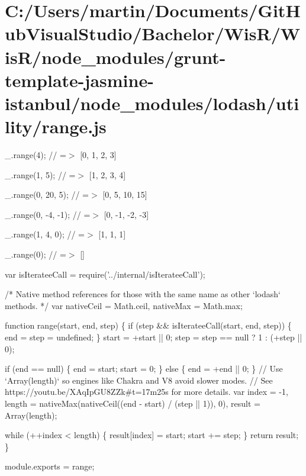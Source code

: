 \hypertarget{_c_1_2_users_2martin_2_documents_2_git_hub_visual_studio_2_bachelor_2_wis_r_2_wis_r_2node_module293574b757bfc04319911d22b9d7889f}{}\section{C\+:/\+Users/martin/\+Documents/\+Git\+Hub\+Visual\+Studio/\+Bachelor/\+Wis\+R/\+Wis\+R/node\+\_\+modules/grunt-\/template-\/jasmine-\/istanbul/node\+\_\+modules/lodash/utility/range.\+js}
\+\_\+.\+range(4); // =$>$ \mbox{[}0, 1, 2, 3\mbox{]}

\+\_\+.\+range(1, 5); // =$>$ \mbox{[}1, 2, 3, 4\mbox{]}

\+\_\+.\+range(0, 20, 5); // =$>$ \mbox{[}0, 5, 10, 15\mbox{]}

\+\_\+.\+range(0, -\/4, -\/1); // =$>$ \mbox{[}0, -\/1, -\/2, -\/3\mbox{]}

\+\_\+.\+range(1, 4, 0); // =$>$ \mbox{[}1, 1, 1\mbox{]}

\+\_\+.\+range(0); // =$>$ \mbox{[}\mbox{]}


\begin{DoxyCodeInclude}
var isIterateeCall = require(\textcolor{stringliteral}{'../internal/isIterateeCall'});

\textcolor{comment}{/* Native method references for those with the same name as other `lodash` methods. */}
var nativeCeil = Math.ceil,
    nativeMax = Math.max;

\textcolor{keyword}{function} range(start, end, step) \{
  \textcolor{keywordflow}{if} (step && isIterateeCall(start, end, step)) \{
    end = step = undefined;
  \}
  start = +start || 0;
  step = step == null ? 1 : (+step || 0);

  \textcolor{keywordflow}{if} (end == null) \{
    end = start;
    start = 0;
  \} \textcolor{keywordflow}{else} \{
    end = +end || 0;
  \}
  \textcolor{comment}{// Use `Array(length)` so engines like Chakra and V8 avoid slower modes.}
  \textcolor{comment}{// See https://youtu.be/XAqIpGU8ZZk#t=17m25s for more details.}
  var index = -1,
      length = nativeMax(nativeCeil((end - start) / (step || 1)), 0),
      result = Array(length);

  \textcolor{keywordflow}{while} (++index < length) \{
    result[index] = start;
    start += step;
  \}
  \textcolor{keywordflow}{return} result;
\}

module.exports = range;
\end{DoxyCodeInclude}
 